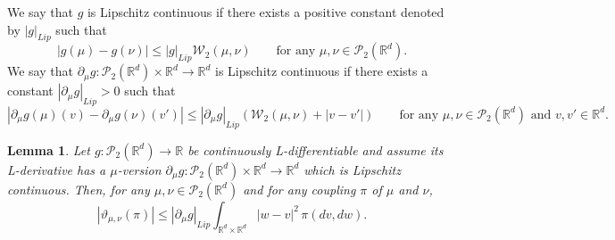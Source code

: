 \documentclass[10pt, a4paper]{article} %
\newcommand{\R}{\mathbb{R}}
\theoremstyle{definition}
\theoremstyle{plain}
\newtheorem{lemma}[defn]{Lemma}
\begin{document}
    \noindent We say that $g$ is Lipschitz continuous if there exists a positive constant denoted by $|g|_{Lip}$ such that \begin{equation*} |g(\mu) - g(\nu) | \le |g|_{Lip} \mathcal{W}_2(\mu,\nu) \qquad \text{for any $\mu,\nu \in \mathcal{P}_2(\R^d)$} . \end{equation*}
    {We say that $\partial_\mu g: \mathcal{P}_2(\R^d) \times \R^d \to \R^d$ is Lipschitz continuous if there exists a constant $|\partial_\mu g|_{Lip} >0$ such that \begin{equation*}
            |\partial_\mu g(\mu)(v) - \partial_\mu g(\nu)(v')| \le |\partial_\mu g|_{Lip} ( \mathcal{W}_2(\mu,\nu) + |v-v'| ) \qquad \text{for any $\mu,\nu \in \mathcal{P}_2(\R^d)$ and $v,v' \in \R^d$}. 
        \end{equation*} 
    }

    \begin{lemma} \label{lemma:remainderinTaylorexpansion}
        Let $g: \mathcal{P}_2(\R^d) \to \R$ be continuously L-differentiable and assume its L-derivative has a $\mu$-version $\partial_\mu g: \mathcal{P}_2(\R^d) \times \R^d \to \R^d$ which is Lipschitz continuous. Then, for any $\mu,\nu \in \mathcal{P}_2(\R^d)$ and for any coupling $\pi$ of $\mu$ and $\nu$, 
            \begin{equation*} 
            | \vartheta_{\mu,\nu} (\pi) | \le  |\partial_\mu g|_{Lip}  \int_{\R^d \times \R^d} |w-v|^2 \, \pi(dv, dw) .
        \end{equation*}
    \end{lemma}
\end{document}
